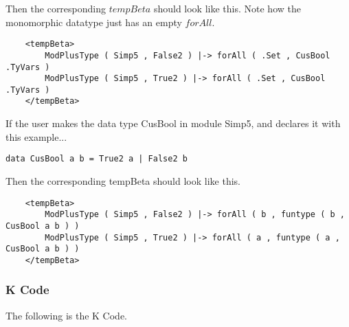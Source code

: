 Then the corresponding $tempBeta$ should look like this. Note how the monomorphic datatype just has an empty $forAll$.

\begin{lstlisting}
    <tempBeta>
        ModPlusType ( Simp5 , False2 ) |-> forAll ( .Set , CusBool .TyVars )
        ModPlusType ( Simp5 , True2 ) |-> forAll ( .Set , CusBool .TyVars )
    </tempBeta>
\end{lstlisting}

If the user makes the data type CusBool in module Simp5, and declares it with this example...
\begin{lstlisting}
data CusBool a b = True2 a | False2 b
\end{lstlisting}

Then the corresponding tempBeta should look like this.
\begin{lstlisting}
    <tempBeta>
        ModPlusType ( Simp5 , False2 ) |-> forAll ( b , funtype ( b , CusBool a b ) )
        ModPlusType ( Simp5 , True2 ) |-> forAll ( a , funtype ( a , CusBool a b ) )
    </tempBeta>

\end{lstlisting}

\subsubsection{K Code}
The following is the K Code.


